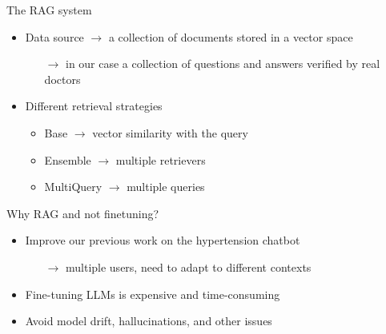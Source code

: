 \documentclass[handout]{beamer}\mode<handout>{\usetheme{AMSBolognaFC}}
\begin{document}
\begin{frame}[allowframebreaks]
    \begin{block}{The RAG system}
        \begin{itemize}
            \item Data source $\rightarrow$ a collection of documents stored in a vector space
            \begin{itemize}
                \item[$\rightarrow$] in our case a collection of questions and answers verified by real doctors
            \end{itemize}
            \item Different retrieval strategies
            \begin{itemize}
                \item Base $\rightarrow$ vector similarity with the query
                \item Ensemble $\rightarrow$ multiple retrievers
                \item MultiQuery $\rightarrow$ multiple queries
            \end{itemize}
        \end{itemize}
    \end{block}
    \begin{block}{Why RAG and not finetuning?}
        \begin{itemize}
            \item Improve our previous work on the hypertension chatbot~
            \begin{itemize}
                \item[$\rightarrow$] multiple users, need to \alert{adapt} to different contexts
            \end{itemize}
            \item Fine-tuning LLMs is expensive and time-consuming
            \item Avoid model \alert{drift}, \alert{hallucinations}, and other issues
        \end{itemize}
    \end{block}
\end{frame}
\end{document}
